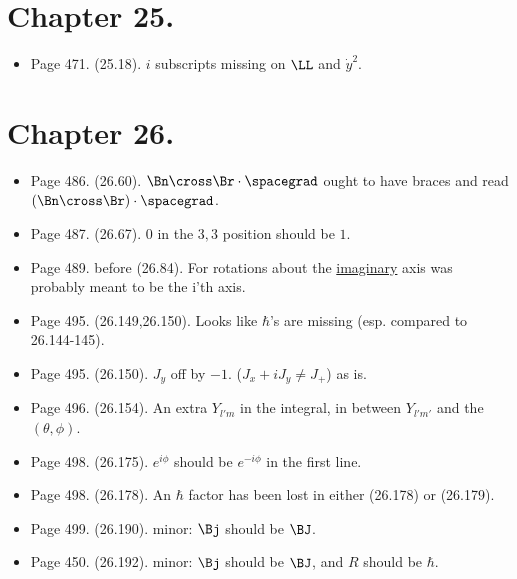 \section{Chapter 25.}
\begin{itemize}
\item Page 471.  (25.18).  $i$ subscripts missing on $\LL$ and $\dot{y}^2$.
\end{itemize}

\section{Chapter 26.}
\begin{itemize}
\item Page 486.  (26.60).  $\Bn \cross \Br \cdot \spacegrad$ ought to have braces and read $(\Bn \cross \Br) \cdot \spacegrad$.
\item Page 487.  (26.67).  $0$ in the $3,3$ position should be $1$.
\item Page 489.  before (26.84).  For rotations about the \underline{imaginary} axis was probably meant to be the i'th axis.
\item Page 495.  (26.149,26.150).  Looks like $\hbar$'s are missing (esp. compared to 26.144-145).
\item Page 495.  (26.150).  $J_y$ off by $-1$. ($J_x + iJ_y \ne J_{+}$) as is.
\item Page 496.  (26.154).  An extra $Y_{l'm}$ in the integral, in between $Y_{l' m'}$ and the $(\theta, \phi)$.
\item Page 498.  (26.175).  $e^{i\phi}$ should be $e^{-i\phi}$ in the first line.
\item Page 498.  (26.178).  An $\hbar$ factor has been lost in either (26.178) or (26.179).
\item Page 499.  (26.190).  minor: $\Bj$ should be $\BJ$.
\item Page 450.  (26.192).  minor: $\Bj$ should be $\BJ$, and $R$ should be $\hbar$.
\end{itemize}

